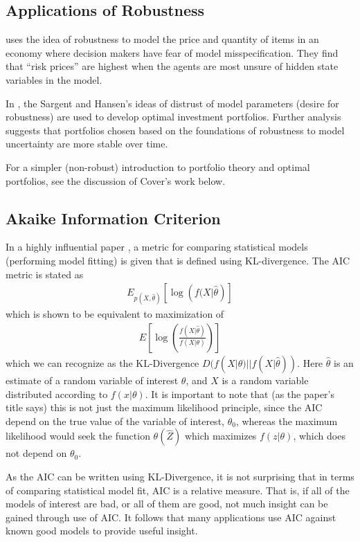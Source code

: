 \documentclass[10pt, twocolumn]{IEEEtran}
\begin{document}
\subsection{Applications of Robustness}

\cite{sargent2015} uses the idea of robustness to model the price and quantity of items in an economy where decision
makers have fear of model misspecification. They find that ``risk prices'' are highest when the agents are most
unsure of hidden state variables in the model.

In \cite{robustPortfolio}, the Sargent and Hansen's ideas of distrust of model parameters (desire for robustness)
are used to develop optimal investment portfolios. Further analysis suggests that portfolios chosen based
on the foundations of robustness to model uncertainty are more stable over time.

For a simpler (non-robust) introduction to portfolio theory and optimal portfolios, see the discussion of Cover's
work below.

\subsection{Akaike Information Criterion}
In a highly influential paper \cite{Akaike1998}, a metric for comparing statistical models (performing model fitting)
is given that is defined using KL-divergence. The AIC metric is stated as
\begin{gather*}
  E_{p(X, \hat{\theta})}\left[\log\left(f(X|\hat{\theta}\right)\right]
\end{gather*}
which is shown to be equivalent to maximization of
\begin{gather*}
  E\left[\log\left(\frac{f(X|\hat{\theta})}{f(X|\theta)}\right)\right]
\end{gather*}
which we can recognize as the KL-Divergence $D(f(X|\theta) || f(X|\hat{\theta}))$. Here $\hat{\theta}$ is
an estimate of a random variable of interest $\theta$, and $X$ is a random variable distributed according to 
$f(x|\theta)$. It is important to note that (as the paper's title says) this is not just the maximum
likelihood principle, since the AIC depend on the true value of the variable of interest, $\theta_{0}$,
whereas the maximum likelihood would seek the function $\theta(\hat{Z})$ which maximizes $f(z|\theta)$,
which does not depend on $\theta_{0}$.

As the AIC can be written using KL-Divergence, it is not surprising that in terms of comparing statistical model
fit, AIC is a relative measure. That is, if all of the models of interest are bad, or all of them are good, not
much insight can be gained through use of AIC. It follows that many applications use AIC against known good models
to provide useful insight.
\end{document}
